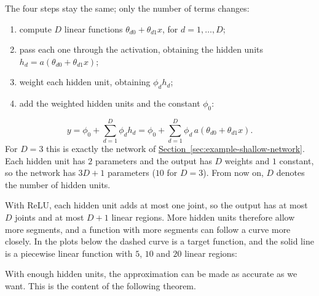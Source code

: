 \documentclass[a4paper,12pt,oneside]{report}
\begin{document}
The four steps stay the same; only the number of terms changes:
\begin{enumerate}
  \item compute $D$ linear functions $\theta_{d0}+\theta_{d1}x$,
        for $d=1,\dots,D$;
  \item pass each one through the activation, obtaining the hidden
        units $h_d=a(\theta_{d0}+\theta_{d1}x)$;
  \item weight each hidden unit, obtaining $\phi_dh_d$;
  \item add the weighted hidden units and the constant $\phi_0$:
\end{enumerate}
\[
  y=\phi_0+\sum_{d=1}^{D}\phi_dh_d
   =\phi_0+\sum_{d=1}^{D}\phi_d\,a(\theta_{d0}+\theta_{d1}x).
\]
For $D=3$ this is exactly the network of
\hyperref[sec:example-shallow-network]{Section~\ref*{sec:example-shallow-network}}.
Each hidden unit has $2$ parameters and the output has $D$ weights and
$1$ constant, so the network has $3D+1$ parameters ($10$ for $D=3$).
From now on, $D$ denotes the number of hidden units.

With ReLU, each hidden unit adds at most one joint, so the output has
at most $D$ joints and at most $D+1$ linear regions. More hidden units
therefore allow more segments, and a function with more segments can
follow a curve more closely. In the plots below the dashed curve is a
target function, and the solid line is a piecewise linear function with
$5$, $10$ and $20$ linear regions:
\begin{center}
\end{center}
With enough hidden units, the approximation can be made as accurate as
we want. This is the content of the following theorem.
\end{document}
